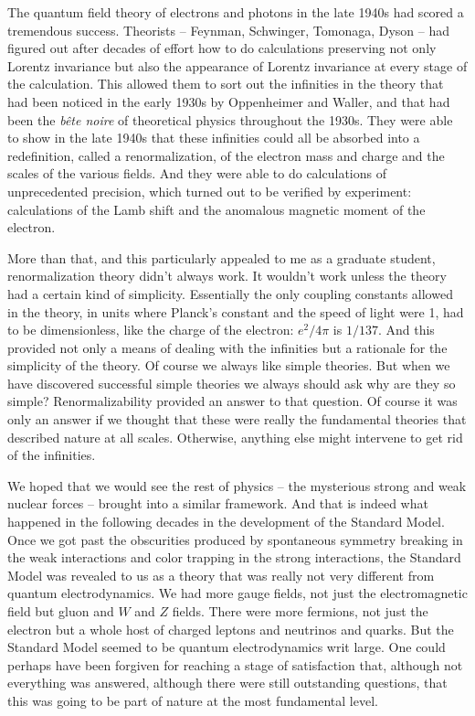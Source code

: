 \documentclass[12pt]{article}
\begin{document}
The quantum field theory of electrons and photons in the late 1940s had scored a tremendous success. Theorists -- Feynman, Schwinger, Tomonaga, Dyson -- had figured out after decades of effort how to do  calculations preserving not only Lorentz invariance but also the appearance of Lorentz invariance at every stage of the calculation. This allowed them to sort out the infinities in the theory that had been noticed in the early 1930s by Oppenheimer and  Waller, and that had been the {\it  b\^ete noire} of theoretical physics throughout the 1930s. They were able to show in the late 1940s that these infinities could all be absorbed into a redefinition, called a renormalization, of the electron mass and charge and the scales of the various fields. And they were able to do calculations of unprecedented precision, which turned out to be verified by experiment: calculations of the Lamb shift and the anomalous magnetic moment of the electron. 

More than that, and this particularly appealed to me as a graduate student, renormalization theory didn't always work. It wouldn't work unless the theory had a certain kind of simplicity. 
Essentially  the only coupling constants allowed in the theory, in units where Planck's constant and the speed of light were 1, had to be dimensionless, like the charge of the electron: $e^2/4\pi$ is $1/137$. And this provided not only a means of dealing with the infinities but a rationale for the simplicity of the theory. Of course we always like simple theories. But when we have discovered successful simple theories we always should ask why are they so simple? Renormalizability provided an answer to that question. Of course it was only an answer if we thought that these were really the fundamental theories that described nature at all scales. Otherwise, anything else might intervene to get rid of the infinities.

We hoped that we would see the rest of physics -- the mysterious strong and weak nuclear forces -- brought into a similar framework. And that is indeed what happened in the following decades in the development of the Standard Model. Once we got past the obscurities produced by spontaneous symmetry breaking in the weak interactions and color trapping in the strong interactions, the Standard Model was revealed to us as a theory that was really not very different from quantum electrodynamics. We had more gauge fields, not just the electromagnetic field but gluon and  $W$ and $Z$ fields. There were more fermions, not just the electron but a whole host of charged leptons and neutrinos and quarks. But the Standard Model seemed to be quantum electrodynamics writ large. One could perhaps  have been forgiven for reaching a stage of satisfaction that, although not everything was answered, although there were still outstanding questions, that this was going to be part of nature at the most fundamental level. 
\end{document}
